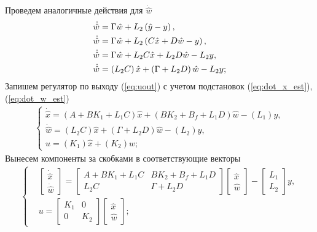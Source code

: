 \documentclass[a4paper, 12pt]{article}
\begin{document}
    Проведем аналогичные действия для $\dot{\hat{w}}$
    \begin{align}
        &\dot{\hat{w}}=\Gamma \hat{w}+L_2\left( \hat{y}-y \right), \notag\\
        &\dot{\hat{w}}=\Gamma \hat{w}+L_2\left( C\hat{x}+D\hat{w}-y \right), \notag\\
        &\dot{\hat{w}}=\Gamma \hat{w}+L_2C\hat{x}+L_2D\hat{w}-L_2y, \notag\\
        &\dot{\hat{w}}=\left( L_2C \right)\hat{x}+\left( \Gamma+L_2D \right)\hat{w}-L_2y \label{eq:dot_w_est};
    \end{align}
    Запишем регулятор по выходу (\ref{eq:uout}) с учетом подстановок (\ref{eq:dot_x_est}), (\ref{eq:dot_w_est})
    \begin{align}
        \begin{cases}
            \dot{\hat{x}}=\left( A+BK_1+L_1C \right)\hat{x}+\left( BK_2+B_f+L_1D \right)\hat{w}-\left(L_1\right)y,\\
            \dot{\hat{w}}=\left( L_2C \right)\hat{x}+\left( \Gamma+L_2D \right)\hat{w}-\left(L_2\right)y,\\
            u=\left(K_1\right)\hat{x}+\left(K_2\right)\hat{w};
        \end{cases}\label{eq:temp_in_state_out}
    \end{align}
    Вынесем компоненты за скобками в соответствующие векторы
    \begin{align}
        \begin{cases}
            &\begin{bmatrix}
                \dot{\hat{x}}\\
                \dot{\hat{w}}
            \end{bmatrix}=\begin{bmatrix}
                A+BK_1+L_1C &BK_2+B_f+L_1D\\
                L_2C &\Gamma+L_2D
            \end{bmatrix}\begin{bmatrix}
                \hat{x}\\
                \hat{w}
            \end{bmatrix}-\begin{bmatrix}
                L_1\\
                L_2
            \end{bmatrix}y,\\
            &u=\begin{bmatrix}
                K_1 &0\\
                0 &K_2
            \end{bmatrix}\begin{bmatrix}
                \hat{x}\\
                \hat{w}
            \end{bmatrix};
        \end{cases}\label{eq:in_state_out}
    \end{align}
\end{document}
